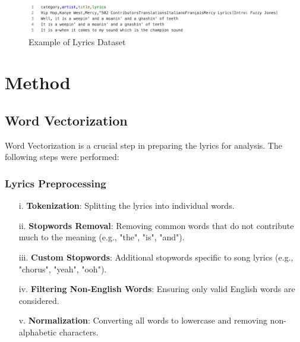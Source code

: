 \documentclass{article}
\begin{document}
\begin{figure}[H]
    \centering
    \includegraphics[width=\textwidth]{lyrics.png}
    \caption{Example of Lyrics Dataset}
    \label{fig:lyrics}
\end{figure}

\section{Method}

\subsection{Word Vectorization}

Word Vectorization is a crucial step in preparing the lyrics for analysis. The following steps were performed:

\subsubsection{Lyrics Preprocessing}
\begin{enumerate}
    \item[i.] \textbf{Tokenization}: Splitting the lyrics into individual words.
    \item[ii.] \textbf{Stopwords Removal}: Removing common words that do not contribute much to the meaning (e.g., "the", "is", "and").
    \item[iii.] \textbf{Custom Stopwords}: Additional stopwords specific to song lyrics (e.g., "chorus", "yeah", "ooh").
    \item[iv.] \textbf{Filtering Non-English Words}: Ensuring only valid English words are considered.
    \item[v.] \textbf{Normalization}: Converting all words to lowercase and removing non-alphabetic characters.
\end{enumerate}
\end{document}
